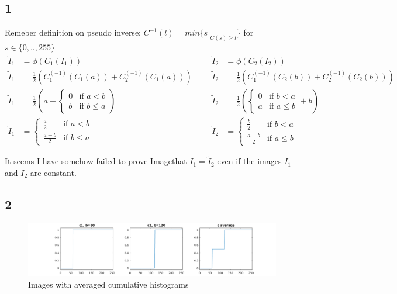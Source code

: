\documentclass[a4paper]{article}
\begin{document}
\subsection*{1}
Remeber definition on pseudo inverse: $C^{-1}(l) = min \{ \left. s \right|_{C(s) \geq l} \}$ for $s \in \{0,..,255\}$
\begin{align}
  \tilde{I}_1 &= \phi(C_1(I_1)) &&&  \tilde{I}_2 &= \phi(C_2(I_2))\\
  \tilde{I}_1 &= \frac{1}{2} \left( C_1^{(-1)}(C_1(a)) + C_2^{(-1)}(C_1(a)) \right) &&&
  \tilde{I}_2 &= \frac{1}{2} \left( C_1^{(-1)}(C_2(b)) + C_2^{(-1)}(C_2(b)) \right)\\
  \tilde{I}_1 &= \frac{1}{2} \left( a + \begin{cases}
                              0 & \text{if } a < b \\
                              b & \text{if } b \leq a
                            \end{cases} \right) &&&
  \tilde{I}_2 &= \frac{1}{2} \left( \begin{cases}
                          0 & \text{if } b < a \\
                          a & \text{if } a \leq b
                        \end{cases} + b \right) \\
  \tilde{I}_1 &= \begin{cases}
      \frac{a}{2} & \text{if } a < b \\
      \frac{a+b}{2} & \text{if } b \leq a
                 \end{cases} &&&
  \tilde{I}_2 &= \begin{cases}
      \frac{b}{2} & \text{if } b < a \\
      \frac{a+b}{2} & \text{if } a \leq b
                 \end{cases}
\end{align}

It seems I have somehow failed to prove Imagethat $\tilde{I}_1 = \tilde{I}_2$ even if the images $I_1$ and $I_2$ are constant.

\subsection*{2}
\begin{figure}[h!]
  \centering
  \includegraphics[width=\linewidth, trim={10 0 0 0 }, clip=true]{./1_8.png}
  \caption{Images with averaged cumulative histograms}
  \label{fig:1.8}
\end{figure}
\end{document}
